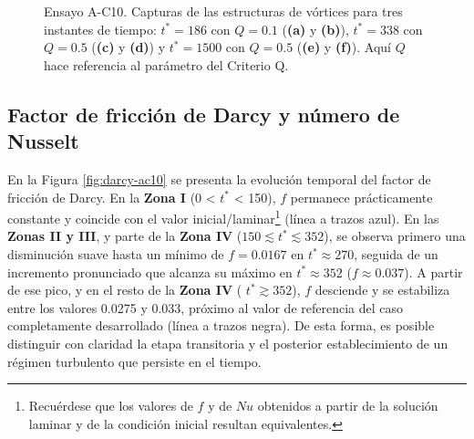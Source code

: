 \begin{figure}
  \caption{Ensayo A-C10. Capturas de las estructuras de vórtices para tres instantes de tiempo: $t^* =186$ con $Q=0\text{.}1$ (\textbf{(a)} y \textbf{(b)}), $t^* =338$ con $Q=0\text{.}5$ (\textbf{(c)} y \textbf{(d)}) y $t^* = 1500$ con $Q=0\text{.}5$ (\textbf{(e)} y \textbf{(f)}). Aquí $Q$ hace referencia al parámetro del Criterio Q.}
  \label{fig:mosaico2-ac10}
\end{figure}


\subsection{Factor de fricción de Darcy y número de Nusselt}
En la Figura \ref{fig:darcy-ac10} se presenta la evolución temporal del factor de fricción de Darcy. En la \textbf{Zona I} (0 < $t^*$ < 150), $f$ permanece prácticamente constante y coincide con el valor inicial/laminar\footnote{Recuérdese que los valores de $f$ y de $Nu$ obtenidos a partir de la solución laminar y de la condición inicial resultan equivalentes.} (línea a trazos azul). En las \textbf{Zonas II y III}, y parte de la \textbf{Zona IV} ($150 \lesssim t^* \lesssim 352 $), se observa primero una disminución suave hasta un mínimo de $f=0\text{.}0167$ en $t^*\approx270$, seguida de un incremento pronunciado que alcanza su máximo en $t^*\approx352$ ($f \approx 0\text{.}037$). A partir de ese pico, y en el resto de la \textbf{Zona IV} ( $t^*\gtrsim352$), $f$ desciende y se estabiliza entre los valores 0.0275 y 0.033, próximo al valor de referencia del caso completamente desarrollado (línea a trazos negra). De esta forma, es posible distinguir con claridad la etapa transitoria y el posterior establecimiento de un régimen turbulento que persiste en el tiempo.

